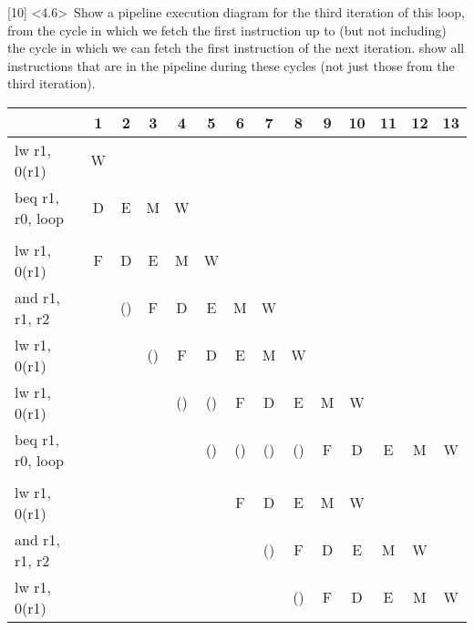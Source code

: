 \documentclass[12pt]{article}
\begin{document}
	
	\noindent {} 
	[10] \textless4.6\textgreater \ Show a pipeline execution diagram for the third iteration of this loop, from the cycle in which we fetch the first instruction up to (but not including) the cycle in which we can fetch the first instruction of the next iteration. show all instructions that are in the pipeline during these cycles (not just those from the third iteration). \vspace{0.2cm} \\
	
	\newpage
	
	\begin{center}
			\begin{tabular}{ |l|c|c|c|c|c|c|c|c|c|c|c|c|c| }
				\hline
				& 1 & 2 & 3 & 4 & 5 & 6 & 7 & 8 & 9 & 10 & 11 & 12 & 13  \\
				\hline
				lw r1, 0(r1)        & W &  &  &  &  &  &  &  &  &  &  & & \\
				\hline
				beq r1, r0, loop    & D & E & M & W &  &  &  &  &  &  &  &  &  \\
				\hline
				                    &  &  &  &  &  &  &  &  &  &  &  &  &    \\
				\hline
				lw r1, 0(r1)        & F & D & E & M & W &  &  &  &  &  &  &  &  \\
				\hline
				and r1, r1, r2      &  & () & F & D & E & M & W &  & & & & &  \\
				\hline
				lw r1, 0(r1)        &  &  & () & F & D & E & M & W &  &  &  &  &    \\
				\hline
				lw r1, 0(r1)        &  &  &  & () & () & F & D & E & M & W &  &  &    \\
				\hline
				beq r1, r0, loop    &  &  &  &  & () & () & () & () & F & D & E & M & W  \\
				\hline
				                    &  &  &  &  &  &  &  &  &  &  &  &  &    \\
				\hline
				lw r1, 0(r1)        &  &  &  &  &  & F & D & E & M & W &  &  &  \\
				\hline
				and r1, r1, r2      &  &  &  &  &  &  & () & F & D & E & M & W &    \\
				\hline
				lw r1, 0(r1)        &  &  &  &  &  &  &  & () & F & D & E & M & W   \\
				\hline
			\end{tabular}
	\end{center}
	
	
	\vspace{0.8cm}
	
\end{document}
